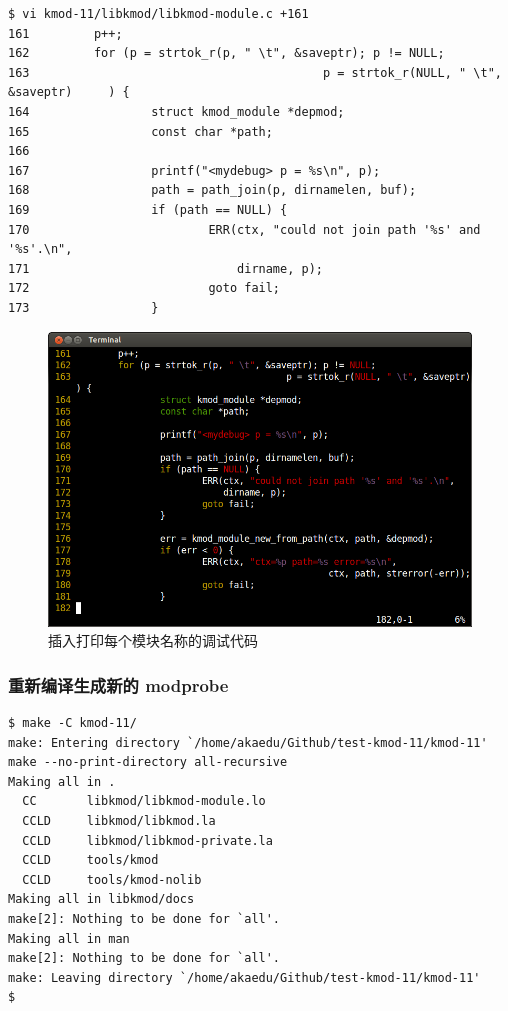 \documentclass[11pt,a4paper]{article}
\makeatletter
\def\maxwidth{\ifdim\Gin@nat@width>\linewidth\linewidth
\else\Gin@nat@width\fi}
\let\Oldincludegraphics\includegraphics
\renewcommand{\includegraphics}[1]{\Oldincludegraphics[width=\maxwidth]{#1}}
\makeatother
\begin{document}
{\begin{shaded}\begin{verbatim}
$ vi kmod-11/libkmod/libkmod-module.c +161
161         p++;
162         for (p = strtok_r(p, " \t", &saveptr); p != NULL;
163                                         p = strtok_r(NULL, " \t", &saveptr)     ) {
164                 struct kmod_module *depmod;
165                 const char *path;
166 
167                 printf("<mydebug> p = %s\n", p);
168                 path = path_join(p, dirnamelen, buf);
169                 if (path == NULL) {
170                         ERR(ctx, "could not join path '%s' and '%s'.\n",
171                             dirname, p);
172                         goto fail;
173                 }
\end{verbatim}\end{shaded}}
\begin{figure}[htbp]
\centering
\includegraphics{./pictures/3-4-print-p.png}
\caption{插入打印每个模块名称的调试代码}
\end{figure}

\subsubsection{重新编译生成新的 modprobe}

{\begin{shaded}\begin{verbatim}
$ make -C kmod-11/
make: Entering directory `/home/akaedu/Github/test-kmod-11/kmod-11'
make --no-print-directory all-recursive
Making all in .
  CC       libkmod/libkmod-module.lo
  CCLD     libkmod/libkmod.la
  CCLD     libkmod/libkmod-private.la
  CCLD     tools/kmod
  CCLD     tools/kmod-nolib
Making all in libkmod/docs
make[2]: Nothing to be done for `all'.
Making all in man
make[2]: Nothing to be done for `all'.
make: Leaving directory `/home/akaedu/Github/test-kmod-11/kmod-11'
$ 
\end{verbatim}\end{shaded}}
\end{document}
